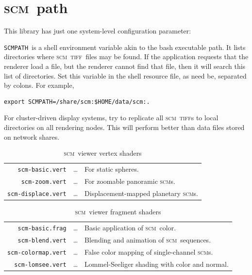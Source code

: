 \documentclass[oneside,10pt]{memoir}
\newcommand{\scm}     {\textsc{scm}}
\newcommand{\tiff}    {\textsc{tiff}}
\newcommand{\scmpath}{\texttt{SCMPATH}}
\newcommand{\B}{\bigstrut[b]}
\newcommand{\T}{\bigstrut[t]}
\begin{document}
\begin{Spacing}{1.1}
\begin{itemize}
\end{itemize}

\section{\scm\ path}
\label{sec:scmpath}

This library has just one system-level configuration parameter:

\scmpath\ is a shell environment variable akin to the bash executable path. It lists directories where \scm\ \tiff\ files may be found. If the application requests that the renderer load a file, but the renderer cannot find that file, then it will search this list of directories. Set this variable in the shell resource file, as need be, separated by colons. For example,

\begin{Verbatim}
export SCMPATH=/share/scm:$HOME/data/scm:.
\end{Verbatim}

For cluster-driven display systems, try to replicate all \scm\ \tiff s to local directories on all rendering nodes. This will perform better than data files stored on network shares.

\begin{table}
  \begin{tabular*}{\textwidth}{rcl}\hline
    \texttt{scm-basic.vert}    & \ldots & For static spheres. \T\\
    \texttt{scm-zoom.vert}     & \ldots & For zoomable panoramic \scm s. \\
    \texttt{scm-displace.vert} & \ldots & Displacement-mapped planetary \scm s. \B\\\hline
  \end{tabular*}
  \caption{\scm\ viewer vertex shaders}
  \label{tab:vert}
\end{table}

\begin{table}
  \begin{tabular*}{\textwidth}{rcl}\hline
    \texttt{scm-basic.frag}    & \ldots & Basic application of \scm\ color.\T\\
    \texttt{scm-blend.vert}    & \ldots & Blending and animation of \scm\ sequences.\\
    \texttt{scm-colormap.vert} & \ldots & False color mapping of single-channel \scm s.\\
    \texttt{scm-lomsee.vert}   & \ldots & Lommel-Seeliger shading with color and normal.\B\\\hline
  \end{tabular*}
  \caption{\scm\ viewer fragment shaders}
  \label{tab:frag}
\end{table}


\end{Spacing}
\end{document}
